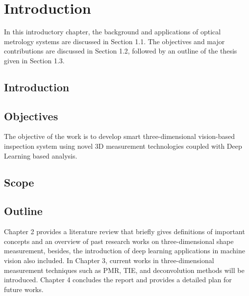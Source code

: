 
\chapter{Introduction}
In this introductory chapter, the background and applications of optical metrology systems are discussed in Section 1.1. The objectives and major contributions are discussed in Section 1.2, followed by an outline of the thesis given in Section 1.3. 

\section{Introduction}

\section{Objectives}
The objective of the work is to develop smart three-dimensional vision-based inspection system using novel 3D measurement technologies coupled with Deep Learning based analysis.

\section{Scope}


\section{Outline}
Chapter 2 provides a literature review that briefly gives definitions of important concepts and an overview of past research works on three-dimensional shape measurement, besides, the introduction of deep learning applications in machine vision also included. In Chapter 3, current works in three-dimensional measurement techniques such as PMR, TIE, and deconvolution methods will be introduced. Chapter 4 concludes the report and provides a detailed plan for future works.
